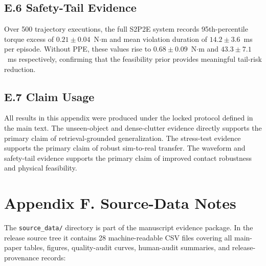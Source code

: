 \documentclass[11pt]{article}
\begin{document}
\subsection{E.6 Safety-Tail Evidence}

Over 500 trajectory executions, the full S2P2E system records 95th-percentile torque excess of $0.21\pm0.04$~N$\cdot$m and mean violation duration of $14.2\pm3.6$~ms per episode. Without PPE, these values rise to $0.68\pm0.09$~N$\cdot$m and $43.3\pm7.1$~ms respectively, confirming that the feasibility prior provides meaningful tail-risk reduction.

\subsection{E.7 Claim Usage}

All results in this appendix were produced under the locked protocol defined in the main text. The unseen-object and dense-clutter evidence directly supports the primary claim of retrieval-grounded generalization. The stress-test evidence supports the primary claim of robust sim-to-real transfer. The waveform and safety-tail evidence supports the primary claim of improved contact robustness and physical feasibility.

\section{Appendix F. Source-Data Notes}

The \texttt{source\_data/} directory is part of the manuscript evidence package. In the release source tree it contains 28 machine-readable CSV files covering all main-paper tables, figures, quality-audit curves, human-audit summaries, and release-provenance records:
\end{document}
